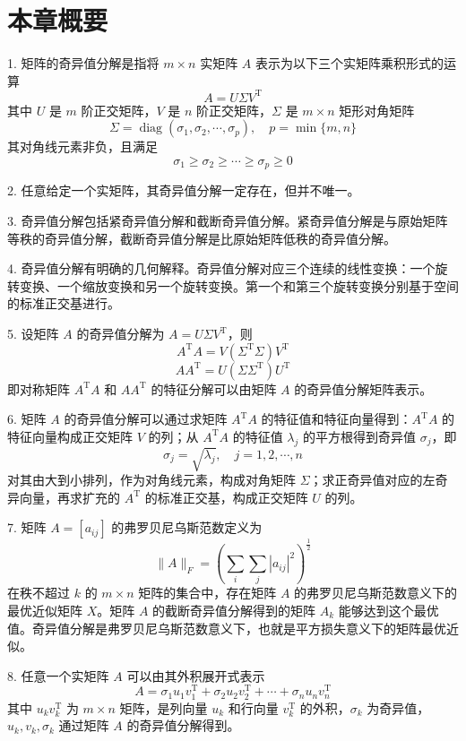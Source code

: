 \documentclass[UTF8, 12pt, fontset=fandol, oneside]{ctexart}
\begin{document}
\section*{本章概要}

1. 矩阵的奇异值分解是指将 $m\times n$ 实矩阵 $A$ 表示为以下三个实矩阵乘积形式的运算
\[
A=U\Sigma V^{\mathrm{T}}
\]
其中 $U$ 是 $m$ 阶正交矩阵，$V$ 是 $n$ 阶正交矩阵，$\Sigma$ 是 $m\times n$ 矩形对角矩阵
\[
\Sigma=\operatorname{diag}(\sigma_1,\sigma_2,\cdots,\sigma_p),\quad p=\min\{m,n\}
\]
其对角线元素非负，且满足
\[
\sigma_1\geqslant\sigma_2\geqslant\cdots\geqslant\sigma_p\geqslant0
\]

2. 任意给定一个实矩阵，其奇异值分解一定存在，但并不唯一。

3. 奇异值分解包括紧奇异值分解和截断奇异值分解。紧奇异值分解是与原始矩阵等秩的奇异值分解，截断奇异值分解是比原始矩阵低秩的奇异值分解。

4. 奇异值分解有明确的几何解释。奇异值分解对应三个连续的线性变换：一个旋转变换、一个缩放变换和另一个旋转变换。第一个和第三个旋转变换分别基于空间的标准正交基进行。

5. 设矩阵 $A$ 的奇异值分解为 $A=U\Sigma V^{\mathrm{T}}$，则
\[
A^{\mathrm{T}}A=V(\Sigma^{\mathrm{T}}\Sigma)V^{\mathrm{T}}
\]
\[
AA^{\mathrm{T}}=U(\Sigma\Sigma^{\mathrm{T}})U^{\mathrm{T}}
\]
即对称矩阵 $A^{\mathrm{T}}A$ 和 $AA^{\mathrm{T}}$ 的特征分解可以由矩阵 $A$ 的奇异值分解矩阵表示。

6. 矩阵 $A$ 的奇异值分解可以通过求矩阵 $A^{\mathrm{T}}A$ 的特征值和特征向量得到：$A^{\mathrm{T}}A$ 的特征向量构成正交矩阵 $V$ 的列；从 $A^{\mathrm{T}}A$ 的特征值 $\lambda_j$ 的平方根得到奇异值 $\sigma_j$，即
\[
\sigma_j=\sqrt{\lambda_j},\quad j=1,2,\cdots,n
\]
对其由大到小排列，作为对角线元素，构成对角矩阵 $\Sigma$；求正奇异值对应的左奇异向量，再求扩充的 $A^{\mathrm{T}}$ 的标准正交基，构成正交矩阵 $U$ 的列。

7. 矩阵 $A=[a_{ij}]$ 的弗罗贝尼乌斯范数定义为
\[
\|A\|_F=\left(\sum_i\sum_j |a_{ij}|^2\right)^{\frac12}
\]
在秩不超过 $k$ 的 $m\times n$ 矩阵的集合中，存在矩阵 $A$ 的弗罗贝尼乌斯范数意义下的最优近似矩阵 $X$。矩阵 $A$ 的截断奇异值分解得到的矩阵 $A_k$ 能够达到这个最优值。奇异值分解是弗罗贝尼乌斯范数意义下，也就是平方损失意义下的矩阵最优近似。

8. 任意一个实矩阵 $A$ 可以由其外积展开式表示
\[
A=\sigma_1u_1v_1^{\mathrm{T}}+\sigma_2u_2v_2^{\mathrm{T}}+\cdots+\sigma_nu_nv_n^{\mathrm{T}}
\]
其中 $u_kv_k^{\mathrm{T}}$ 为 $m\times n$ 矩阵，是列向量 $u_k$ 和行向量 $v_k^{\mathrm{T}}$ 的外积，$\sigma_k$ 为奇异值，$u_k,v_k,\sigma_k$ 通过矩阵 $A$ 的奇异值分解得到。
\end{document}
